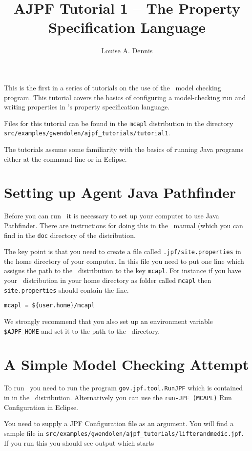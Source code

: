 \documentclass[a4]{article}
\author{Louise A. Dennis}
\title{AJPF Tutorial 1 -- The Property Specification Language}
\begin{document}
\maketitle
This is the first in a series of tutorials on the use of the \ajpf\ model checking program.  This tutorial covers the basics of configuring a model-checking run and writing properties in \ajpf's property specification language.

Files for this tutorial can be found in the \texttt{mcapl} distribution in the directory \texttt{src/examples/gwendolen/ajpf\_tutorials/tutorial1}.

The tutorials assume some familiarity with the basics of running Java programs either at the command line or in Eclipse.

\section{Setting up Agent Java Pathfinder}
Before you can run \ajpf\ it is necessary to set up your computer to use Java Pathfinder.  There are instructions for doing this in the \mcapl\ manual (which you can find in the \texttt{doc} directory of the distribution.

The key point is that you need to create a file called \texttt{.jpf/site.properties} in the home directory of your computer.  In this file you need to put one line which assigns the path to the \mcapl\ distribution to the key \texttt{mcapl}.  For instance if you have your \mcapl\ distribution in your home directory as  folder called \texttt{mcapl} then \texttt{site.properties} should contain the line.

\begin{verbatim}
mcapl = ${user.home}/mcapl
\end{verbatim}

We strongly recommend that you also set up an environment variable \texttt{\$AJPF\_HOME} and set it to the path to the \mcapl\ directory.

\section{A Simple Model Checking Attempt}

To run \ajpf\ you need to run the program \texttt{gov.jpf.tool.RunJPF} which is contained in  in the \mcapl\ distribution.  Alternatively you can use the \texttt{run-JPF (MCAPL)} Run Configuration in Eclipse.

You need to supply a JPF Configuration file as an argument.  You will find a sample file in \texttt{src/examples/gwendolen/ajpf\_tutorials/lifterandmedic.jpf}.  If you run this you should see output which starts
\end{document}
